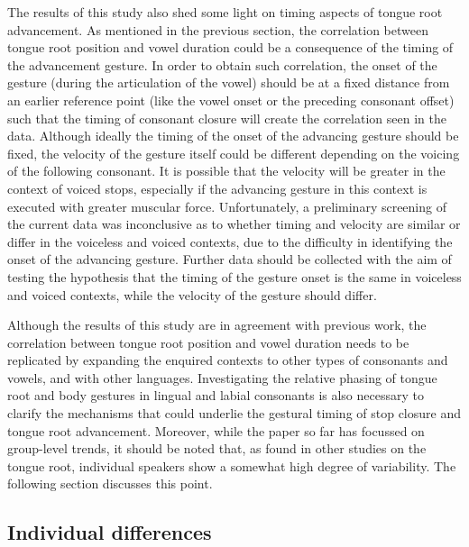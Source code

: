 \documentclass[12pt,]{article}
\begin{document}
The results of this study also shed some light on timing aspects of
tongue root advancement. As mentioned in the previous section, the
correlation between tongue root position and vowel duration could be a
consequence of the timing of the advancement gesture. In order to obtain
such correlation, the onset of the gesture (during the articulation of
the vowel) should be at a fixed distance from an earlier reference point
(like the vowel onset or the preceding consonant offset) such that the
timing of consonant closure will create the correlation seen in the
data. Although ideally the timing of the onset of the advancing gesture
should be fixed, the velocity of the gesture itself could be different
depending on the voicing of the following consonant. It is possible that
the velocity will be greater in the context of voiced stops, especially
if the advancing gesture in this context is executed with greater
muscular force. Unfortunately, a preliminary screening of the current
data was inconclusive as to whether timing and velocity are similar or
differ in the voiceless and voiced contexts, due to the difficulty in
identifying the onset of the advancing gesture. Further data should be
collected with the aim of testing the hypothesis that the timing of the
gesture onset is the same in voiceless and voiced contexts, while the
velocity of the gesture should differ.

Although the results of this study are in agreement with previous work,
the correlation between tongue root position and vowel duration needs to
be replicated by expanding the enquired contexts to other types of
consonants and vowels, and with other languages. Investigating the
relative phasing of tongue root and body gestures in lingual and labial
consonants is also necessary to clarify the mechanisms that could
underlie the gestural timing of stop closure and tongue root
advancement. Moreover, while the paper so far has focussed on
group-level trends, it should be noted that, as found in other studies
on the tongue root, individual speakers show a somewhat high degree of
variability. The following section discusses this point.

\hypertarget{individual-differences}{%
\subsection{Individual differences}\label{individual-differences}}

\label{s:idio}
\end{document}
